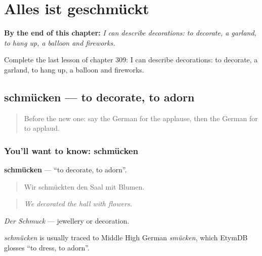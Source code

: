 
\chapter{Alles ist geschmückt}
\label{ch:ge-alles-ist-geschmuckt}

\begin{chapteropening}
\textbf{By the end of this chapter:} \emph{I can describe decorations: to decorate, a garland, to hang up, a balloon and fireworks.}

Complete the last lesson of chapter 309: I can describe decorations: to decorate, a garland, to hang up, a balloon and fireworks.
\end{chapteropening}

\section[schmücken]{schmücken — to decorate, to adorn}

\label{lesson:GE-C309-schmuecken}



\begin{quote}
Before the new one: say the German for the applause, then the German for to applaud.
\end{quote}

\subsection*{You'll want to know: schmücken}
\textbf{schmücken} — \textquotedblleft{}to decorate, to adorn\textquotedblright{}.

\begin{quote}
Wir schmückten den Saal mit Blumen.
\end{quote}

\begin{quote}
\emph{We decorated the hall with flowers.}
\end{quote}

\emph{Der Schmuck} — jewellery or decoration.

\begin{cousinweb}
\emph{schmücken} is usually traced to Middle High German \emph{smücken}, which EtymDB glosses \textquotedblleft{}to dress, to adorn\textquotedblright{}.
\end{cousinweb}

